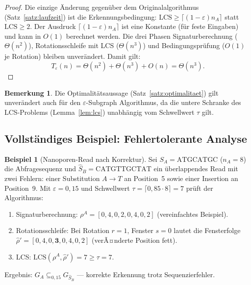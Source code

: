 ﻿\documentclass[a4paper,12pt]{article}
\theoremstyle{definition}
\newtheorem{beispiel}{Beispiel}
\newtheorem{bemerkung}{Bemerkung}
\begin{document}
\begin{proof}
    Die einzige \"{A}nderung gegen\"{u}ber dem Originalalgorithmus
    (Satz~\ref{satz:laufzeit}) ist die Erkennungsbedingung:
    $\mathrm{LCS} \geq \lceil(1-\varepsilon)n_A\rceil$ statt
    $\mathrm{LCS} \geq 2$. Der Ausdruck $\lceil(1-\varepsilon)n_A\rceil$
    ist eine Konstante (f\"{u}r feste Eingaben) und kann in $O(1)$ berechnet
    werden. Die drei Phasen Signaturberechnung ($\Theta(n^2)$),
    Rotationsschleife mit LCS ($\Theta(n^3)$) und Bedingungspr\"{u}fung ($O(1)$
    je Rotation) bleiben unver\"{a}ndert. Damit gilt:
    \[
        T_\varepsilon(n) = \Theta(n^2) + \Theta(n^3) + O(n) = \Theta(n^3).
    \]
\end{proof}

\begin{bemerkung}
    Die Optimalit\"{a}tsaussage (Satz~\ref{satz:optimalitaet}) gilt unver\"{a}ndert
    auch f\"{u}r den $\varepsilon$-Subgraph Algorithmus, da die untere
    Schranke des LCS-Problems (Lemma~\ref{lem:lcs}) unabh\"{a}ngig vom
    Schwellwert $\tau$ gilt.
\end{bemerkung}

\subsection{Vollst\"{a}ndiges Beispiel: Fehlertolerante Analyse}

\begin{beispiel}[Nanoporen-Read nach Korrektur]
    Sei $S_A = \text{ATGCATGC}$ ($n_A = 8$) die Abfragesequenz und
    $\hat{S}_B = \text{CATGTTGCTAT}$ ein \"{u}berlappendes Read mit
    zwei Fehlern: einer Substitution $A \to T$ an Position~5 sowie
    einer Insertion an Position~9. Mit $\varepsilon = 0{,}15$ und
    Schwellwert $\tau = \lceil 0{,}85 \cdot 8 \rceil = 7$ pr\"{u}ft
    der Algorithmus:
    \begin{enumerate}
        \item Signaturberechnung: $\rho^A = [0, 4, 0, 2, 0, 4, 0, 2]$
              (vereinfachtes Beispiel).
        \item Rotationsschleife: Bei Rotation $r = 1$, Fenster $s = 0$
              lautet die Fensterfolge $\hat{\rho}' = [0, 4, 0, \mathbf{3}, 0, 4, 0, 2]$
              (verÃ¤nderte Position fett).
        \item LCS: $\mathrm{LCS}(\rho^A, \hat{\rho}') = 7 \geq \tau = 7$.
    \end{enumerate}
    Ergebnis: $G_A \subseteq_{0{,}15} G_{\hat{S}_B}$ --- korrekte Erkennung
    trotz Sequenzierfehler.
\end{beispiel}
\end{document}
